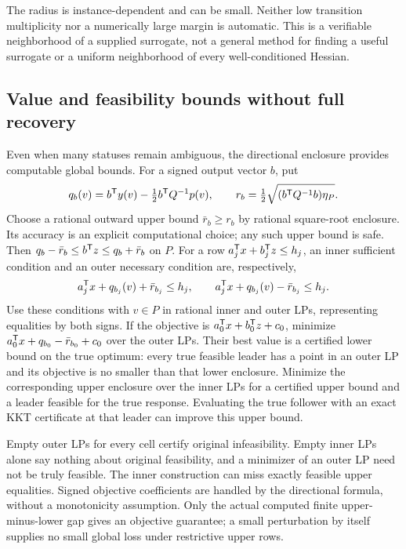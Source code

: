 The radius is instance-dependent and can be small. Neither low transition
multiplicity nor a numerically large margin is automatic. This is a
verifiable neighborhood of a supplied surrogate, not a general method
for finding a useful surrogate or a uniform neighborhood of every
well-conditioned Hessian.

\subsection{Value and feasibility bounds without full recovery}
\label{subsec:screening-bounds}

Even when many statuses remain ambiguous, the directional enclosure
provides computable global bounds. For a signed output vector $b$, put
\[
 q_b(v)=b^{\mathsf T} y(v)-\tfrac12b^{\mathsf T} Q^{-1}p(v),\qquad
 r_b=\tfrac12\sqrt{(b^{\mathsf T} Q^{-1}b)\eta_P}.
\]
Choose a rational outward upper bound $\bar r_b\ge r_b$ by rational
square-root enclosure. Its accuracy is an explicit computational choice;
any such upper bound is safe. Then
$q_b-\bar r_b\le b^{\mathsf T} z\le q_b+\bar r_b$ on $P$.
For a row $a_j^{\mathsf T} x+b_j^{\mathsf T} z\le h_j$, an inner sufficient
condition and an outer necessary condition are, respectively,
\begin{equation}\label{eq:screening-inner-outer}
 a_j^{\mathsf T} x+q_{b_j}(v)+\bar r_{b_j}\le h_j,\qquad
 a_j^{\mathsf T} x+q_{b_j}(v)-\bar r_{b_j}\le h_j.
\end{equation}
Use these conditions with $v\in P$ in rational inner and outer LPs,
representing equalities by both signs. If the objective is
$a_0^{\mathsf T} x+b_0^{\mathsf T} z+c_0$, minimize
$a_0^{\mathsf T} x+q_{b_0}-\bar r_{b_0}+c_0$ over the outer LPs.
Their best value is a certified lower bound on the true optimum:
every true feasible leader has a point in an outer LP and its objective
is no smaller than that lower enclosure. Minimize the corresponding
upper enclosure over the inner LPs for a certified upper bound and a
leader feasible for the true response. Evaluating the true follower
with an exact KKT certificate at that leader can improve this upper bound.

Empty outer LPs for every cell certify original infeasibility. Empty
inner LPs alone say nothing about original feasibility, and a minimizer
of an outer LP need not be truly feasible. The inner construction can
miss exactly feasible upper equalities. Signed objective coefficients
are handled by the directional formula, without a monotonicity
assumption. Only the actual computed finite upper-minus-lower gap gives
an objective guarantee; a small perturbation by itself supplies no
small global loss under restrictive upper rows.

